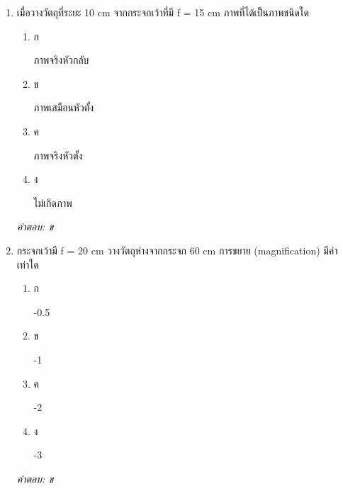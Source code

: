 \documentclass[12pt]{article}
\begin{document}
\begin{enumerate}[label=\arabic*., itemsep=0.5\baselineskip, topsep=0.5\baselineskip, leftmargin=*]
\item เมื่อวางวัตถุที่ระยะ 10 cm จากกระจกเว้าที่มี f = 15 cm ภาพที่ได้เป็นภาพชนิดใด
\begin{enumerate}[label=\alph*)., itemsep=0.3\baselineskip, topsep=0.3\baselineskip]
\item ก\ 
\begin{minipage}[t]{0.9\linewidth}
\raggedright ภาพจริงหัวกลับ
\end{minipage}
\item ข\ 
\begin{minipage}[t]{0.9\linewidth}
\raggedright ภาพเสมือนหัวตั้ง
\end{minipage}
\item ค\ 
\begin{minipage}[t]{0.9\linewidth}
\raggedright ภาพจริงหัวตั้ง
\end{minipage}
\item ง\ 
\begin{minipage}[t]{0.9\linewidth}
\raggedright ไม่เกิดภาพ
\end{minipage}
\end{enumerate}
\vspace{-0.3\baselineskip}
\begin{small}
\textit{คำตอบ: ข}
\end{small}

\item กระจกเว้ามี f = 20 cm วางวัตถุห่างจากกระจก 60 cm การขยาย (magnification) มีค่าเท่าใด
\begin{enumerate}[label=\alph*)., itemsep=0.3\baselineskip, topsep=0.3\baselineskip]
\item ก\ 
\begin{minipage}[t]{0.9\linewidth}
\raggedright -0.5
\end{minipage}
\item ข\ 
\begin{minipage}[t]{0.9\linewidth}
\raggedright -1
\end{minipage}
\item ค\ 
\begin{minipage}[t]{0.9\linewidth}
\raggedright -2
\end{minipage}
\item ง\ 
\begin{minipage}[t]{0.9\linewidth}
\raggedright -3
\end{minipage}
\end{enumerate}
\vspace{-0.3\baselineskip}
\begin{small}
\textit{คำตอบ: ข}
\end{small}


\end{enumerate}
\end{document}
